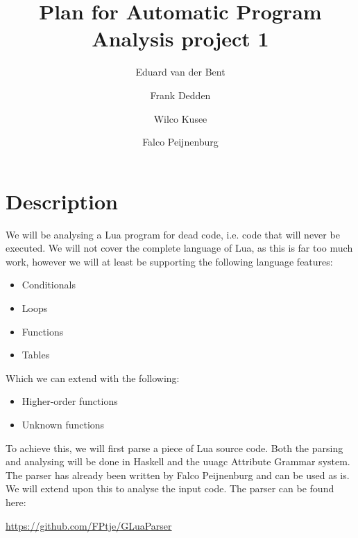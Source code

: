 \documentclass[10pt]{article}
\title{Plan for Automatic Program Analysis project 1}
\author{Eduard van der Bent \and Frank Dedden \and Wilco Kusee \and Falco Peijnenburg}
\begin{document}
\maketitle

\section*{Description}
We will be analysing a Lua program for dead code, i.e. code that will never be executed. We will not cover the complete language of Lua, as this is far too much work, however we will at least be supporting the following language features:
\begin{itemize}
	\item Conditionals
	\item Loops
	\item Functions
	\item Tables
\end{itemize}
Which we can extend with the following:
\begin{itemize}
	\item Higher-order functions
	\item Unknown functions
\end{itemize}
To achieve this, we will first parse a piece of Lua source code. Both the parsing and analysing will be done in Haskell and the uuagc Attribute Grammar system. The parser has already been written by Falco Peijnenburg and can be used as is. We will extend upon this to analyse the input code. The parser can be found here:

\url{https://github.com/FPtje/GLuaParser}
\end{document}
